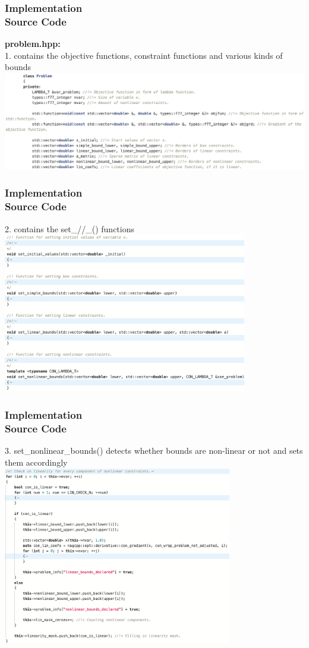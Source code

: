 \documentclass[ucs,10pt]{beamer}
\begin{document}
\begin{frame}
\frametitle{Implementation \\
\small \color{rwth-blue} Source Code}
\textbf{problem.hpp:}\\ \vspace{1em}
1. contains the objective functions, constraint functions and various kinds of bounds\\
\vspace{1em}
\includegraphics[width=\textwidth]{code_problem1.png}
\end{frame}

\begin{frame}
\frametitle{Implementation \\
\small \color{rwth-blue} Source Code}
2. contains the set\_//\_() functions\\
\vspace{1em}
\includegraphics[width=0.8\textwidth]{code_problem2.png}
\end{frame}

\begin{frame}
\frametitle{Implementation \\
\small \color{rwth-blue}Source Code}
3. set\_nonlinear\_bounds() detects whether bounds are non-linear or not and sets them accordingly\\
\includegraphics[width=0.75\textwidth]{code_problem3.png}
\end{frame}
\end{document}

